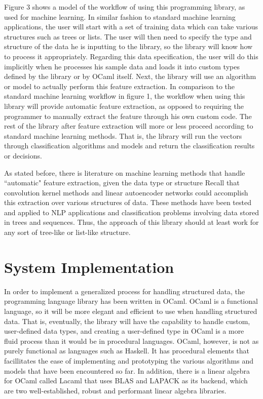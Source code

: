 \documentclass{sig-alternate}
\begin{document}
Figure 3 shows a model of the workflow of using this programming library, as used for machine learning. 
In similar fashion to standard machine learning applications, the user will start with a set of training data which can 
take various structures such as trees or lists. The user will then need to specify the type and 
structure of the data he is inputting to the library, so the library will know how to process it 
appropriately. Regarding this data specification, the user will do this implicitly when he processes 
his sample data and loads it into custom types defined by the library or by OCaml itself. 
Next, the library will use an algorithm or model to actually perform this feature extraction. In 
comparison to the standard machine learning workflow in figure 1, the workflow when using this 
library will provide automatic feature extraction, as opposed to requiring the programmer to 
manually extract the feature through his own custom code.  The rest of the library after feature 
extraction will more or less proceed according to standard machine learning methods.
That is, the library will run the vectors through classification algorithms and models 
and return the classification results or decisions.

As stated before, there is literature on machine learning methods that handle ``automatic" feature extraction, given
the data type or structure Recall that convolution kernel methods and linear autoencoder networks 
could accomplish this extraction over various structures of data. These methods have been tested and 
applied to NLP applications and classification problems involving data stored in trees and sequences.
Thus, the approach of this library should at least work for any sort of tree-like or list-like 
structure.

\section{System Implementation}
\label{sec:sysimp}


In order to implement a generalized process for handling structured data, the programming language 
library has been written in OCaml. OCaml is a functional language, so it will be more elegant and 
efficient to use when handling structured data. That is, eventually, the library will have the 
capability to handle custom, user-defined data types, and creating a user-defined type in OCaml is a 
more fluid process than it would be in procedural languages. OCaml, however, is not as purely 
functional as languages such as Haskell. It has procedural elements that facillitates the ease of 
implementing and prototyping the various algorithms and models that have been encountered so far. In addition, 
there is a linear algebra for OCaml called Lacaml that uses BLAS and LAPACK as its backend, which 
are two well-established, robust and performant linear algebra libraries.
\end{document}
